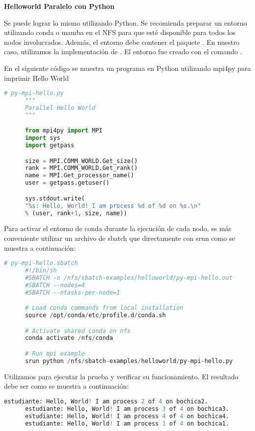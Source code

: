 \begin{spacing}{1.5}
  \textbf{Helloworld Paralelo con Python}

  Se puede lograr lo mismo utilizando Python. Se recomienda preparar un
  entorno utilizando conda o mamba en el NFS para que esté disponible para
  todos
  los nodos involucrados. Además, el entorno debe contener el paquete
  . En nuestro caso, utilizamos la implementación de .
  El entorno fue creado con el comando 
    .

    En el siguiente código se muestra un programa en Python utilizando mpi4py para imprimir Hello World

    \begin{lstlisting}[language=python]
      # py-mpi-hello.py
      """
      Parallel Hello World
      """

      from mpi4py import MPI
      import sys
      import getpass

      size = MPI.COMM_WORLD.Get_size()
      rank = MPI.COMM_WORLD.Get_rank()
      name = MPI.Get_processor_name()
      user = getpass.getuser()

      sys.stdout.write(
      "%s: Hello, World! I am process %d of %d on %s.\n"
      % (user, rank+1, size, name))

    \end{lstlisting}
      
    Para activar el entorno de conda durante la ejecución de cada nodo, es más conveniente utilizar un archivo de sbatch que directamente con srun como se muestra a continuación:

    \begin{lstlisting}[language=python]
      # py-mpi-hello.sbatch
      #!/bin/sh
      #SBATCH -o /nfs/sbatch-examples/helloworld/py-mpi-hello.out
      #SBATCH --nodes=4
      #SBATCH --ntasks-per-node=1

      # Load conda commands from local installation
      source /opt/conda/etc/profile.d/conda.sh

      # Activate shared conda on nfs
      conda activate /nfs/conda

      # Run mpi example
      srun python /nfs/sbatch-examples/helloworld/py-mpi-hello.py
    \end{lstlisting}

    Utilizamos  para ejecutar la prueba y verificar su funcionamiento. El resultado debe ser como se muestra a continuación:

      \begin{lstlisting}[language=python]
      estudiante: Hello, World! I am process 2 of 4 on bochica2.
      estudiante: Hello, World! I am process 3 of 4 on bochica3.
      estudiante: Hello, World! I am process 4 of 4 on bochica4.
      estudiante: Hello, World! I am process 1 of 4 on bochica1. 
      \end{lstlisting}
      

\end{spacing}
